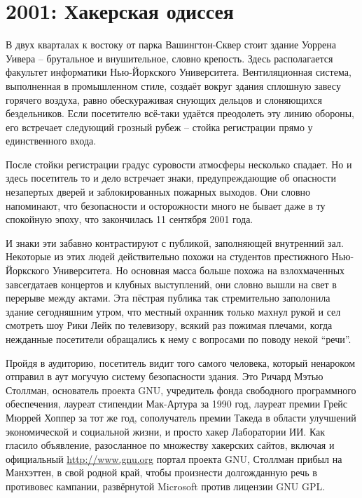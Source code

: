 
\chapter{2001: Хакерская одиссея}

В двух кварталах к востоку от парка Вашингтон-Сквер стоит здание Уоррена Уивера -- брутальное и внушительное, словно крепость. Здесь располагается факультет информатики Нью-Йоркского Университета. Вентиляционная система, выполненная в промышленном стиле, создаёт вокруг здания сплошную завесу горячего воздуха, равно обескураживая снующих дельцов и слоняющихся бездельников. Если посетителю всё-таки удаётся преодолеть эту линию обороны, его встречает следующий грозный рубеж -- стойка регистрации прямо у единственного входа.

После стойки регистрации градус суровости атмосферы несколько спадает. Но и здесь посетитель то и дело встречает знаки, предупреждающие об опасности незапертых дверей и заблокированных пожарных выходов. Они словно напоминают, что безопасности и осторожности много не бывает даже в ту спокойную эпоху, что закончилась 11 сентября 2001 года.

И знаки эти забавно контрастируют с публикой, заполняющей внутренний зал. Некоторые из этих людей действительно похожи на студентов престижного Нью-Йоркского Университета. Но основная масса больше похожа на взлохмаченных завсегдатаев концертов и клубных выступлений, они словно вышли на свет в перерыве между актами. Эта пёстрая публика так стремительно заполонила здание сегодняшним утром, что местный охранник только махнул рукой и сел смотреть шоу Рики Лейк по телевизору, всякий раз пожимая плечами, когда нежданные посетители обращались к нему с вопросами по поводу некой \enquote{речи}.

Пройдя в аудиторию, посетитель видит того самого человека, который ненароком отправил в аут могучую систему безопасности здания. Это Ричард Мэтью Столлман, основатель проекта GNU, учредитель фонда свободного программного обеспечения, лауреат стипендии Мак-Артура за 1990 год, лауреат премии Грейс Мюррей Хоппер за тот же год, сополучатель премии Такеда в области улучшений экономической и социальной жизни, и просто хакер Лаборатории ИИ. Как гласило объявление, разосланное по множеству хакерских сайтов, включая и официальный \url{http://www.gnu.org} портал проекта GNU, Столлман прибыл на Манхэттен, в свой родной край, чтобы произнести долгожданную речь в противовес кампании, развёрнутой Microsoft против лицензии GNU GPL.

